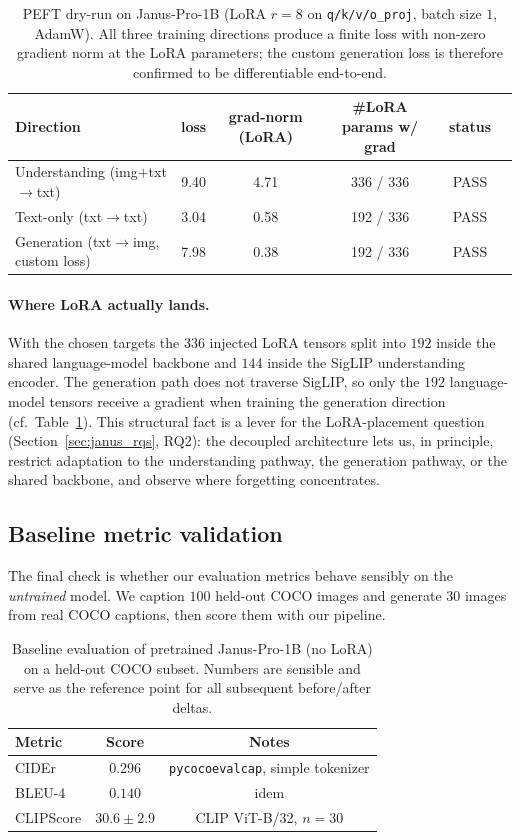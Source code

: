 \begin{table}[h]
\centering
\small
\begin{tabular}{lccccl}
\toprule
Direction & loss & grad-norm (LoRA) & \#LoRA params w/ grad & status \\
\midrule
Understanding (img$+$txt$\rightarrow$txt)        & 9.40 & 4.71 & 336 / 336 & PASS \\
Text-only (txt$\rightarrow$txt)                  & 3.04 & 0.58 & 192 / 336 & PASS \\
Generation (txt$\rightarrow$img, custom loss)    & 7.98 & 0.38 & 192 / 336 & PASS \\
\bottomrule
\end{tabular}
\caption{PEFT dry-run on Janus-Pro-1B (LoRA $r{=}8$ on
\texttt{q/k/v/o\_proj}, batch size $1$, AdamW). All three training directions
produce a finite loss with non-zero gradient norm at the LoRA parameters; the
custom generation loss is therefore confirmed to be differentiable end-to-end.}
\label{tab:dryrun}
\end{table}

\paragraph{Where LoRA actually lands.} With the chosen targets the $336$
injected LoRA tensors split into $192$ inside the shared language-model
backbone and $144$ inside the SigLIP understanding encoder. The generation
path does not traverse SigLIP, so only the $192$ language-model tensors
receive a gradient when training the generation direction (cf.\
Table~\ref{tab:dryrun}). This structural fact is a lever for the
LoRA-placement question (Section~\ref{sec:janus_rqs}, RQ2): the decoupled
architecture lets us, in principle, restrict adaptation to the understanding
pathway, the generation pathway, or the shared backbone, and observe where
forgetting concentrates.

\subsection{Baseline metric validation}
\label{sec:baseline}

The final check is whether our evaluation metrics behave sensibly on the
\emph{untrained} model. We caption $100$ held-out COCO images and generate
$30$ images from real COCO captions, then score them with our pipeline.

\begin{table}[h]
\centering
\small
\begin{tabular}{lcc}
\toprule
Metric & Score & Notes \\
\midrule
CIDEr     & $0.296$        & \texttt{pycocoevalcap}, simple tokenizer \\
BLEU-4    & $0.140$        & idem \\
CLIPScore & $30.6 \pm 2.9$ & CLIP ViT-B/32, $n=30$ \\
\bottomrule
\end{tabular}
\caption{Baseline evaluation of pretrained Janus-Pro-1B (no LoRA) on a held-out
COCO subset. Numbers are sensible and serve as the reference point for all
subsequent before/after deltas.}
\label{tab:baseline}
\end{table}

